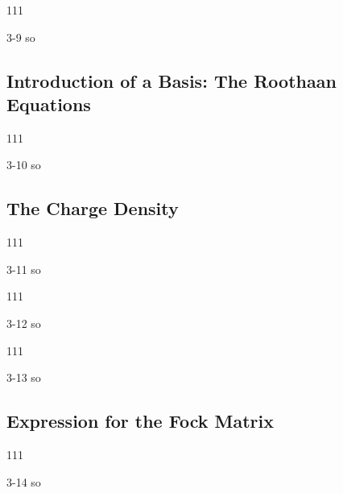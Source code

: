 \documentclass[a4paper]{book}
\begin{document}
	\begin{exercise}
	111
	\end{exercise}
	
	\begin{solution}
		3-9 so
	\end{solution}
	
	\subsection{Introduction of a Basis: The Roothaan Equations}
	
	\begin{exercise}
	111
	\end{exercise}
	
	\begin{solution}
		3-10 so
	\end{solution}
	
	\subsection{The Charge Density}
	
	\begin{exercise}
	111
	\end{exercise}
	
	\begin{solution}
		3-11 so
	\end{solution}
	
	\begin{exercise}
	111
	\end{exercise}
	
	\begin{solution}
		3-12 so
	\end{solution}
	
	\begin{exercise}
	111
	\end{exercise}
	
	\begin{solution}
		3-13 so
	\end{solution}
	
	\subsection{Expression for the Fock Matrix}
	
	\begin{exercise}
	111
	\end{exercise}
	
	\begin{solution}
		3-14 so
	\end{solution}
	
\end{document}
